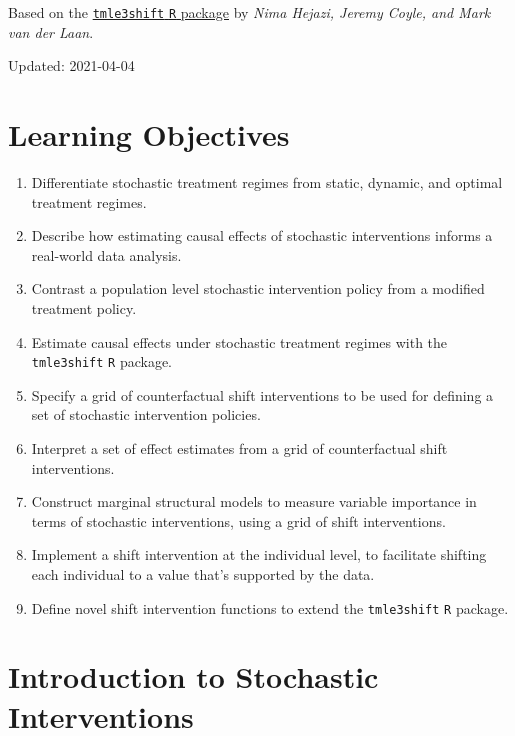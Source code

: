 \documentclass[12pt, krantz2,]{book}
\providecommand{\tightlist}{%
  \setlength{\itemsep}{0pt}\setlength{\parskip}{0pt}}
\theoremstyle{definition}
\theoremstyle{definition}
\theoremstyle{definition}
\newcommand{\1}{\mathbbm{1}}
\begin{document}
Based on the \href{https://github.com/tlverse/tmle3shift}{\texttt{tmle3shift} \texttt{R} package}
by \emph{Nima Hejazi, Jeremy Coyle, and Mark van der Laan}.

Updated: 2021-04-04

\hypertarget{learning-objectives-5}{%
\section{Learning Objectives}\label{learning-objectives-5}}

\begin{enumerate}
\def\labelenumi{\arabic{enumi}.}
\tightlist
\item
  Differentiate stochastic treatment regimes from static, dynamic, and optimal
  treatment regimes.
\item
  Describe how estimating causal effects of stochastic interventions informs a
  real-world data analysis.
\item
  Contrast a population level stochastic intervention policy from a modified
  treatment policy.
\item
  Estimate causal effects under stochastic treatment regimes with the
  \texttt{tmle3shift} \texttt{R} package.
\item
  Specify a grid of counterfactual shift interventions to be used for defining
  a set of stochastic intervention policies.
\item
  Interpret a set of effect estimates from a grid of counterfactual shift
  interventions.
\item
  Construct marginal structural models to measure variable importance in terms
  of stochastic interventions, using a grid of shift interventions.
\item
  Implement a shift intervention at the individual level, to facilitate
  shifting each individual to a value that's supported by the data.
\item
  Define novel shift intervention functions to extend the \texttt{tmle3shift} \texttt{R}
  package.
\end{enumerate}

\hypertarget{introduction-to-stochastic-interventions}{%
\section{Introduction to Stochastic Interventions}\label{introduction-to-stochastic-interventions}}
\end{document}
